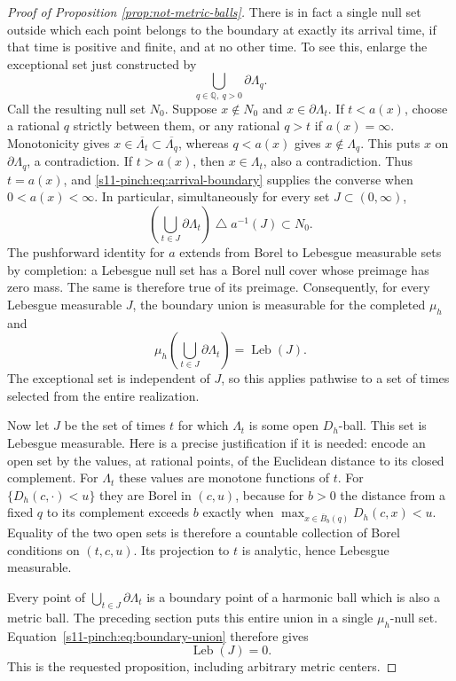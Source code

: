 \documentclass[12pt]{amsart}
\numberwithin{equation}{section}
\begin{document}
\begin{proof}[Proof of Proposition \ref{prop:not-metric-balls}]
There is in fact a single null set outside which each point
belongs to the boundary at exactly its arrival time, if that
time is positive and finite, and at no other time.
To see this, enlarge the exceptional set just constructed by
\[
             \bigcup_{q\in\mathbb Q,\ q>0}\partial\Lambda_q.
\]
Call the resulting null set $N_0$.
Suppose $x\notin N_0$ and $x\in\partial\Lambda_t$.
If $t<a(x)$, choose a rational $q$ strictly between them,
or any rational $q>t$ if $a(x)=\infty$.
Monotonicity gives
$x\in\overline{\Lambda_t}\subset\overline{\Lambda_q}$,
whereas $q<a(x)$ gives $x\notin\Lambda_q$.
This puts $x$ on $\partial\Lambda_q$, a contradiction.
If $t>a(x)$, then $x\in\Lambda_t$, also a contradiction.
Thus $t=a(x)$, and \eqref{s11-pinch:eq:arrival-boundary} supplies the
converse when $0<a(x)<\infty$.
In particular, simultaneously for every set
$J\subset(0,\infty)$,
\[
 \left(\bigcup_{t\in J}\partial\Lambda_t\right)
                  \mathbin{\triangle}a^{-1}(J)\subset N_0.
\]
The pushforward identity for $a$ extends from Borel to
Lebesgue measurable sets by completion: a Lebesgue null
set has a Borel null cover whose preimage has zero mass.
The same is therefore true of its preimage.
Consequently, for every Lebesgue measurable $J$, the
boundary union is measurable for the completed $\mu_h$ and
\begin{equation}\label{s11-pinch:eq:boundary-union}
       \mu_h\left(\bigcup_{t\in J}\partial\Lambda_t\right)
                         =\operatorname{Leb}(J).
\end{equation}
The exceptional set is independent of $J$, so this applies
pathwise to a set of times selected from the entire realization.

Now let $J$ be the set of times $t$ for which $\Lambda_t$ is
some open $D_h$-ball. This set is Lebesgue measurable.
Here is a precise justification if it is needed: encode an
open set by the values, at rational points, of the Euclidean
distance to its closed complement. For $\Lambda_t$ these
values are monotone functions of $t$. For
$\{D_h(c,\cdot)<u\}$ they are Borel in $(c,u)$, because for
$b>0$ the distance from a fixed $q$ to its complement exceeds
$b$ exactly when
$\max_{x\in\overline B_b(q)}D_h(c,x)<u$.
Equality of the two open sets is therefore a countable
collection of Borel conditions on $(t,c,u)$. Its projection
to $t$ is analytic, hence Lebesgue measurable.

Every point of $\bigcup_{t\in J}\partial\Lambda_t$ is a
boundary point of a harmonic ball which is also a metric
ball. The preceding section puts this entire union in a
single $\mu_h$-null set. Equation~\eqref{s11-pinch:eq:boundary-union}
therefore gives
\[
                         \operatorname{Leb}(J)=0.
\]
This is the requested proposition, including arbitrary metric
centers.

\end{proof}
\end{document}
